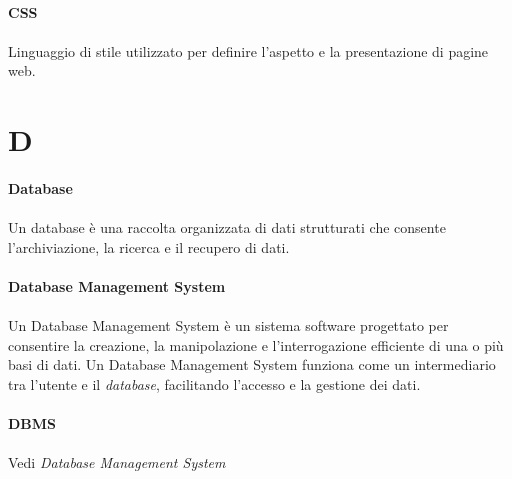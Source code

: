 \documentclass[10pt, a4paper]{article}
\begin{document}
\paragraph{CSS}\noindent\hrulefill
\paragraph{}Linguaggio di stile utilizzato per definire l'aspetto e la presentazione di pagine web.



\newpage
\section{D}
\vspace{2em}
\paragraph{Database}\noindent\hrulefill
\paragraph{}Un database è una raccolta organizzata di dati strutturati che consente l'archiviazione, la ricerca e il recupero di dati.

\vspace{2em}
\paragraph{Database Management System}\noindent\hrulefill
\paragraph{}Un Database Management System è un sistema software progettato per consentire la creazione, la manipolazione e l’interrogazione efficiente di una o più basi di dati. Un Database Management System funziona come un intermediario tra l’utente e il \textit{database\pg}, facilitando l’accesso e la gestione dei dati.

\vspace{2em}
\paragraph{DBMS}\noindent\hrulefill
\paragraph{}Vedi \textit{Database Management System\pg}
\end{document}
